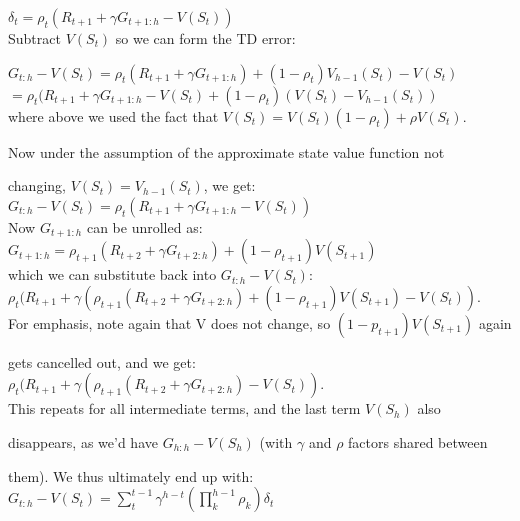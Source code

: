 \documentclass{article}
\begin{document}
$\delta_{t} = \rho_{t}(R_{t+1} + \gamma G_{t+1:h} - V(S_{t}))$ 
\\

Subtract $V(S_{t})$ so we can form the TD error: 

$G_{t:h} - V(S_{t})= \rho_{t}(R_{t+1} + \gamma G_{t+1:h}) + (1-\rho_{t})V_{h-1}(S_{t}) - V(S_{t})$
\\

$= \rho_{t}(R_{t+1} + \gamma G_{t+1:h} - V(S_{t}) + (1-\rho_{t})(V(S_{t}) - V_{h-1}(S_{t}))$
\\

where above we used the fact that $V(S_{t}) = V(S_{t})(1-\rho_{t}) + \rho V(S_{t})$. 

Now under the assumption of the approximate state value function not 

changing, $V(S_{t}) = V_{h-1}(S_{t})$, we get: 
\\

$G_{t:h} - V(S_{t}) =  \rho_{t}(R_{t+1} + \gamma G_{t+1:h} - V(S_{t}))$
\\

Now $G_{t+1:h}$ can be unrolled as:
\\

$G_{t+1:h} = \rho_{t+1}(R_{t+2} + \gamma G_{t+2:h}) + (1 - \rho_{t+1})V(S_{t+1})$
\\

which we can substitute back into $G_{t:h} - V(S_{t})$:
\\

$\rho_{t}(R_{t+1} + \gamma (\rho_{t+1}(R_{t+2} + \gamma G_{t+2:h}) + (1 - \rho_{t+1})V(S_{t+1}) - V(S_{t}))$. 
\\

For emphasis, note again that V does not change, so $(1-p_{t+1})V(S_{t+1})$ again 

gets cancelled out, and we get:
\\

$\rho_{t}(R_{t+1} + \gamma (\rho_{t+1}(R_{t+2} + \gamma G_{t+2:h}) - V(S_{t}))$. 
\\

This repeats for all intermediate terms, and the last term $V(S_h)$ also 

disappears, as we'd have $G_{h:h} - V(S_{h})$ (with $\gamma$ and $\rho$ factors shared between 

them). We thus ultimately end up with: 
\\

$G_{t:h} - V(S_{t}) = \sum_{t}^{t-1}\gamma^{h-t}(\prod_{k}^{h-1}\rho_{k})\delta_{t}$
\end{document}
